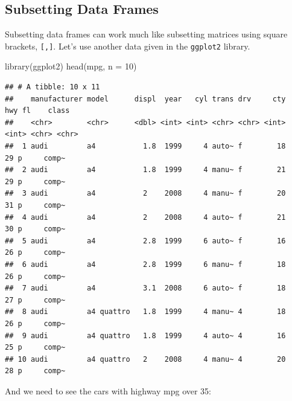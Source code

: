 \documentclass[
]{book}
\newenvironment{Shaded}{\begin{snugshade}}{\end{snugshade}}
\newcommand{\AttributeTok}[1]{\textcolor[rgb]{0.77,0.63,0.00}{#1}}
\newcommand{\DecValTok}[1]{\textcolor[rgb]{0.00,0.00,0.81}{#1}}
\newcommand{\FunctionTok}[1]{\textcolor[rgb]{0.00,0.00,0.00}{#1}}
\newcommand{\NormalTok}[1]{#1}
\newcommand{\SpecialCharTok}[1]{\textcolor[rgb]{0.00,0.00,0.00}{#1}}
\newcommand{\StringTok}[1]{\textcolor[rgb]{0.31,0.60,0.02}{#1}}
\begin{document}
\hypertarget{subsetting-data-frames}{%
\subsection{Subsetting Data Frames}\label{subsetting-data-frames}}

Subsetting data frames can work much like subsetting matrices using square brackets, \texttt{{[},{]}}. Let's use another data given in the \texttt{ggplot2} library.

\begin{Shaded}
\begin{Highlighting}[]
\FunctionTok{library}\NormalTok{(ggplot2)}
\FunctionTok{head}\NormalTok{(mpg, }\AttributeTok{n =} \DecValTok{10}\NormalTok{)}
\end{Highlighting}
\end{Shaded}

\begin{verbatim}
## # A tibble: 10 x 11
##    manufacturer model      displ  year   cyl trans drv     cty   hwy fl    class
##    <chr>        <chr>      <dbl> <int> <int> <chr> <chr> <int> <int> <chr> <chr>
##  1 audi         a4           1.8  1999     4 auto~ f        18    29 p     comp~
##  2 audi         a4           1.8  1999     4 manu~ f        21    29 p     comp~
##  3 audi         a4           2    2008     4 manu~ f        20    31 p     comp~
##  4 audi         a4           2    2008     4 auto~ f        21    30 p     comp~
##  5 audi         a4           2.8  1999     6 auto~ f        16    26 p     comp~
##  6 audi         a4           2.8  1999     6 manu~ f        18    26 p     comp~
##  7 audi         a4           3.1  2008     6 auto~ f        18    27 p     comp~
##  8 audi         a4 quattro   1.8  1999     4 manu~ 4        18    26 p     comp~
##  9 audi         a4 quattro   1.8  1999     4 auto~ 4        16    25 p     comp~
## 10 audi         a4 quattro   2    2008     4 manu~ 4        20    28 p     comp~
\end{verbatim}

And we need to see the cars with highway mpg over 35:

\begin{Shaded}
\end{Shaded}
\end{document}
